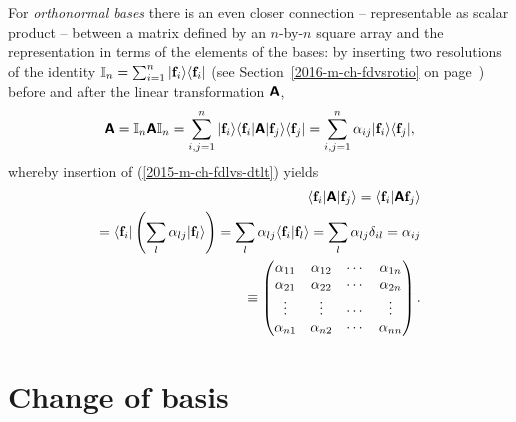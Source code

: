 For {\em orthonormal bases}
there is an even closer connection -- representable as scalar product -- between a matrix
defined by an $n$-by-$n$ square array and the representation in terms of the elements of the bases:
 by inserting
two resolutions of the identity
${\Bbb I}_n = \sum_{i=1}^n
\vert {\bf f}_i\rangle \langle {\bf f}_i \vert$
(see Section~\ref{2016-m-ch-fdvsrotio} on page~\pageref{2016-m-ch-fdvsrotio}) before and after the
linear transformation $\textsf{\textbf{A}}$,
\begin{equation}
\textsf{\textbf{A}}  =
{\Bbb I}_n \textsf{\textbf{A}} {\Bbb I}_n  =
\sum_{i,j=1}^n
\vert {\bf f}_i\rangle \langle {\bf f}_i\vert \textsf{\textbf{A}}\vert {\bf f}_j\rangle \langle {\bf f}_j\vert  =
\sum_{i,j=1}^n \alpha_{ij}
\vert {\bf f}_i\rangle  \langle {\bf f}_j\vert,
\end{equation}
whereby  insertion of (\ref{2015-m-ch-fdlvs-dtlt}) yields
\begin{equation}
\begin{split}
 \langle {\bf f}_i \vert \textsf{\textbf{A}} \vert {\bf f}_j\rangle
= \langle {\bf f}_i \vert \textsf{\textbf{A}}   {\bf f}_j\rangle \\
= \langle {\bf f}_i \vert \left( \sum_l \alpha_{lj}\vert {\bf f}_l \rangle \right)
=  \sum_l \alpha_{lj} \langle {\bf f}_i \vert {\bf f}_l \rangle
=  \sum_l \alpha_{lj} \delta_{il}  = \alpha_{ij} \\
\equiv
\begin{pmatrix}
\alpha_{11}&
\alpha_{12}&
\cdots    &
\alpha_{1n}\\
\alpha_{21}&
\alpha_{22}&
\cdots    &
\alpha_{2n}\\
\vdots&
\vdots&
\cdots    &
\vdots\\
\alpha_{n1}&
\alpha_{n2}&
\cdots   &
\alpha_{nn}
\end{pmatrix}
.
\end{split}
\end{equation}









\section{Change of basis}
\label{2012-m-ch-fdlvs-changeofbasis}

